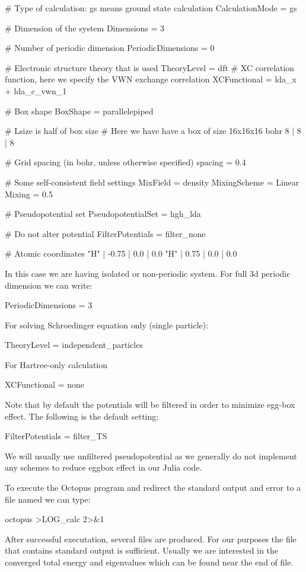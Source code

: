 \begin{textcode}
# Type of calculation: gs means ground state calculation
CalculationMode = gs

# Dimension of the system
Dimensions = 3

# Number of periodic dimension
PeriodicDimensions = 0

# Electronic structure theory that is used
TheoryLevel = dft
# XC correlation function, here we specify the VWN exchange correlation
XCFunctional = lda_x + lda_c_vwn_1

# Box shape
BoxShape = parallelepiped

# Lsize is half of box size
# Here we have have a box of size 16x16x16 bohr
 8 | 8 | 8
%

# Grid spacing (in bohr, unless otherwise specified)
spacing = 0.4

# Some self-consistent field settings
MixField = density
MixingScheme = Linear
Mixing = 0.5

# Pseudopotential set
PseudopotentialSet = hgh_lda

# Do not alter potential
FilterPotentials = filter_none

# Atomic coordinates
  "H" | -0.75 | 0.0 | 0.0
  "H" |  0.75 | 0.0 | 0.0
%
\end{textcode}

In this case we are having isolated or non-periodic system.
For full 3d periodic dimension we can write:
\begin{textcode}
PeriodicDimensions = 3
\end{textcode}

For solving Schroedinger equation only (single particle):
\begin{textcode}
TheoryLevel = independent_particles
\end{textcode}

For Hartree-only calculation
\begin{textcode}
XCFunctional = none
\end{textcode}

Note that by default the potentials will be filtered in order to minimize egg-box effect.
The following is the default setting:
\begin{textcode}
FilterPotentials = filter_TS
\end{textcode}
We will usually use unfiltered pseudopotential as we generally do not implement any
schemes to reduce eggbox effect in our Julia code.

To execute the \textsf{Octopus} program and redirect the standard output and error to a
file named  we can type:
\begin{textcode}
octopus >LOG_calc 2>&1
\end{textcode}
After successful executation, several files are produced. For our purposes the
 file that contains standard output is sufficient. Usually we
are interested in the converged total energy and eigenvalues which can be found
near the end of  file.

